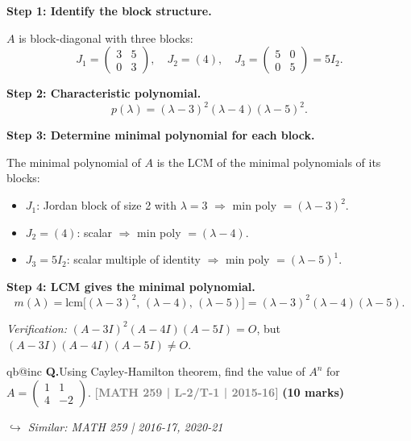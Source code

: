 \documentclass[12pt,a3paper]{article}
\makeatletter
\newcommand{\yr}[1]{\hfill\textcolor{gray}{\small\textbf{[#1]}}}
\newcommand{\mk}[1]{\textcolor{orange!70!black}{\small\textbf{(#1 marks)}}}
\newcommand{\variant}[1]{\par\vspace{1pt}\textcolor{blue!50!black}%
  {\footnotesize\textit{$\hookrightarrow$ Similar: #1}}}
\newcounter{qnum}
\newcommand{\Q}[1]{%
  \csname qb@inc\endcsname
  \needspace{4\baselineskip}
  \refstepcounter{qnum}
  \vspace{6pt}
  \noindent\textbf{Q\theqnum.}\enspace #1\par
}
\makeatother
\begin{document}
\begin{tcolorbox}[enhanced,breakable,
  colback=cE!4,colframe=cE,boxrule=0.8pt,arc=5pt,
  title={\textbf{Answer --- Minimal Polynomial of $A$ (5$\times$5)}},
  fonttitle=\bfseries\color{white},colbacktitle=cE]

\textbf{Step 1: Identify the block structure.}

$A$ is block-diagonal with three blocks:
\[
J_1=\begin{pmatrix}3&5\\0&3\end{pmatrix},\quad J_2=(4),\quad J_3=\begin{pmatrix}5&0\\0&5\end{pmatrix}=5I_2.
\]

\textbf{Step 2: Characteristic polynomial.}
\[
p(\lambda)=(\lambda-3)^2(\lambda-4)(\lambda-5)^2.
\]

\textbf{Step 3: Determine minimal polynomial for each block.}

The minimal polynomial of $A$ is the LCM of the minimal polynomials of its blocks:

\begin{itemize}
  \item $J_1$: Jordan block of size 2 with $\lambda=3$ $\Rightarrow$ min poly $= (\lambda-3)^2$.
  \item $J_2=(4)$: scalar $\Rightarrow$ min poly $= (\lambda-4)$.
  \item $J_3=5I_2$: scalar multiple of identity $\Rightarrow$ min poly $= (\lambda-5)^1$.
\end{itemize}

\textbf{Step 4: LCM gives the minimal polynomial.}
\[
\boxed{m(\lambda)=\mathrm{lcm}\bigl[(\lambda-3)^2,\,(\lambda-4),\,(\lambda-5)\bigr]=(\lambda-3)^2(\lambda-4)(\lambda-5).}
\]

\textit{Verification:} $(A-3I)^2(A-4I)(A-5I)=O$, but $(A-3I)(A-4I)(A-5I)\neq O$.\;\checkmark

\end{tcolorbox}

\Q{Using Cayley-Hamilton theorem, find the value of $A^n$ for $A = \begin{pmatrix} 1 & 1 \\ 4 & -2 \end{pmatrix}$.
\yr{MATH 259 | L-2/T-1 | 2015-16} \mk{10}
\variant{MATH 259 | 2016-17, 2020-21}}
\end{document}
